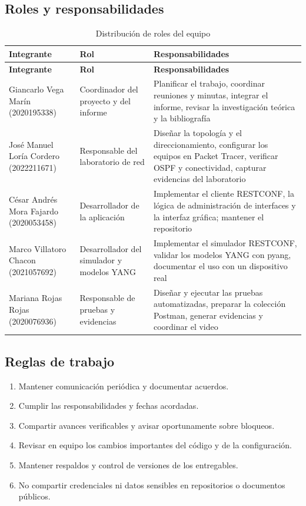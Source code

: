 \subsection{Roles y responsabilidades}
\begin{longtable}{p{3.6cm}p{3.4cm}p{6.6cm}}
\caption{Distribución de roles del equipo}\\
\toprule
\textbf{Integrante} & \textbf{Rol} & \textbf{Responsabilidades} \\
\midrule
\endfirsthead
\toprule
\textbf{Integrante} & \textbf{Rol} & \textbf{Responsabilidades} \\
\midrule
\endhead
Giancarlo Vega Marín (2020195338) & Coordinador del proyecto y del informe & Planificar el trabajo, coordinar reuniones y minutas, integrar el informe, revisar la investigación teórica y la bibliografía \\
José Manuel Loría Cordero (2022211671) & Responsable del laboratorio de red & Diseñar la topología y el direccionamiento, configurar los equipos en Packet Tracer, verificar OSPF y conectividad, capturar evidencias del laboratorio \\
César Andrés Mora Fajardo (2020053458) & Desarrollador de la aplicación & Implementar el cliente RESTCONF, la lógica de administración de interfaces y la interfaz gráfica; mantener el repositorio \\
Marco Villatoro Chacon (2021057692) & Desarrollador del simulador y modelos YANG & Implementar el simulador RESTCONF, validar los modelos YANG con pyang, documentar el uso con un dispositivo real \\
Mariana Rojas Rojas (2020076936) & Responsable de pruebas y evidencias & Diseñar y ejecutar las pruebas automatizadas, preparar la colección Postman, generar evidencias y coordinar el video \\
\bottomrule
\end{longtable}

\subsection{Reglas de trabajo}
\begin{enumerate}
  \item Mantener comunicación periódica y documentar acuerdos.
  \item Cumplir las responsabilidades y fechas acordadas.
  \item Compartir avances verificables y avisar oportunamente sobre bloqueos.
  \item Revisar en equipo los cambios importantes del código y de la configuración.
  \item Mantener respaldos y control de versiones de los entregables.
  \item No compartir credenciales ni datos sensibles en repositorios o documentos públicos.
\end{enumerate}


